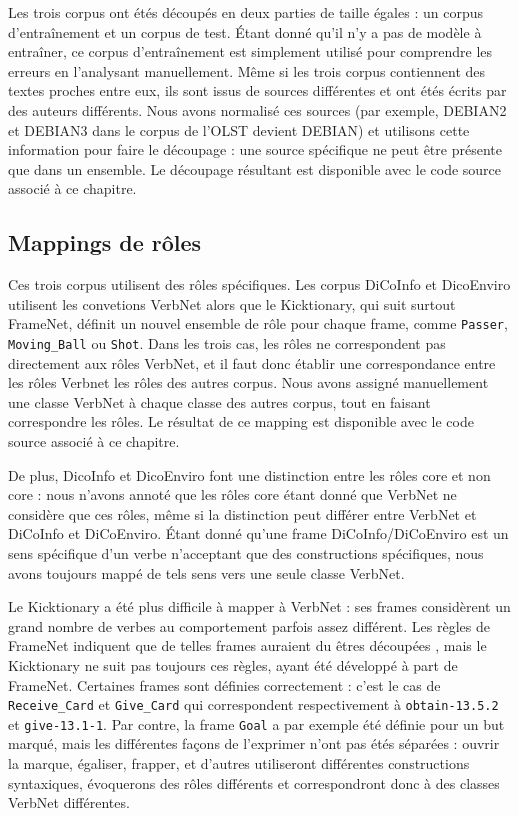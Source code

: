 Les trois corpus ont étés découpés en deux parties de taille égales : un corpus
d'entraînement et un corpus de test. Étant donné qu'il n'y a pas de modèle à
entraîner, ce corpus d'entraînement est simplement utilisé pour comprendre les
erreurs en l'analysant manuellement. Même si les trois corpus contiennent des
textes proches entre eux, ils sont issus de sources différentes et ont étés
écrits par des auteurs différents. Nous avons normalisé ces sources (par
exemple, DEBIAN2 et DEBIAN3 dans le corpus de l'OLST devient DEBIAN) et
utilisons cette information pour faire le découpage : une source spécifique ne
peut être présente que dans un ensemble. Le découpage résultant est disponible
avec le code source associé à ce chapitre.

\subsection{Mappings de rôles}

Ces trois corpus utilisent des rôles spécifiques. Les corpus DiCoInfo et
DicoEnviro utilisent les convetions VerbNet alors que le Kicktionary, qui suit
surtout FrameNet, définit un nouvel ensemble de rôle pour chaque frame, comme
\texttt{Passer}, \texttt{Moving\_Ball} ou \texttt{Shot}. Dans les trois cas,
les rôles ne correspondent pas directement aux rôles VerbNet, et il faut donc
établir une correspondance entre les rôles Verbnet les rôles des autres corpus.
Nous avons assigné manuellement une classe VerbNet à chaque classe des autres
corpus, tout en faisant correspondre les rôles. Le résultat de ce mapping est
disponible avec le code source associé à ce chapitre.

De plus, DicoInfo et DicoEnviro font une distinction entre les rôles core et
non core : nous n'avons annoté que les rôles core étant donné que VerbNet ne
considère que ces rôles, même si la distinction peut différer entre VerbNet et
DiCoInfo et DiCoEnviro. Étant donné qu'une frame DiCoInfo/DiCoEnviro est un
sens spécifique d'un verbe n'acceptant que des constructions spécifiques, nous
avons toujours mappé de tels sens vers une seule classe VerbNet.

Le Kicktionary a été plus difficile à mapper à VerbNet : ses frames considèrent
un grand nombre de verbes au comportement parfois assez différent. Les règles
de FrameNet indiquent que de telles frames auraient du êtres découpées
\citep{ruppenhofer2006extended}, mais le Kicktionary ne suit pas toujours ces
règles, ayant été développé à part de FrameNet. Certaines frames sont définies
correctement : c'est le cas de \texttt{Receive\_Card} et \texttt{Give\_Card}
qui correspondent respectivement à \texttt{obtain-13.5.2} et
\texttt{give-13.1-1}. Par contre, la frame \texttt{Goal} a par exemple été
définie pour un but marqué, mais les différentes façons de l'exprimer n'ont pas
étés séparées : ouvrir la marque, égaliser, frapper, et d'autres utiliseront
différentes constructions syntaxiques, évoquerons des rôles différents et
correspondront donc à des classes VerbNet différentes.

